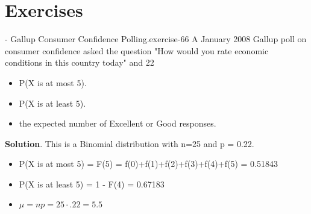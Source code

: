 \documentclass[10pt,]{book}
\numberwithin{equation}{section}
\begin{document}
\section[{Exercises}]{Exercises}\label{section-50}
\hypertarget{p-1003}{}%
\begin{inlineexercise}{- Gallup Consumer Confidence Polling.}{exercise-66}%
\hypertarget{p-1004}{}%
A January 2008 Gallup poll on consumer confidence asked the question "How would you rate economic conditions in this country today" and 22%
\begin{itemize}[label=\textbullet]
\item{}P(X is at most 5).%
\item{}P(X is at least 5).%
\item{}the expected number of Excellent or Good responses.%
\end{itemize}
%
\textbf{Solution}.\quad%
\hypertarget{p-1005}{}%
This is a Binomial distribution with n=25 and p = 0.22. \leavevmode%
\begin{itemize}[label=\textbullet]
\item{}P(X is at most 5) = F(5) = f(0)+f(1)+f(2)+f(3)+f(4)+f(5) = 0.51843%
\item{}P(X is at least 5) = 1 - F(4) = 0.67183%
\item{}\(\mu = np = 25 \cdot .22 = 5.5\)%
\end{itemize}
%
\end{inlineexercise}
%
\par
\hypertarget{p-1006}{}%
\end{document}
